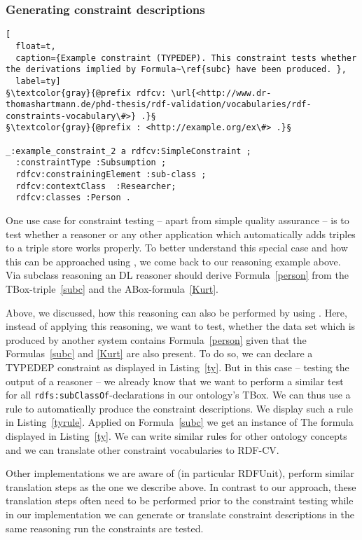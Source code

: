 \subsubsection{Generating constraint descriptions}
\begin{lstlisting}[
  float=t,
  caption={Example constraint (TYPEDEP). This constraint tests whether the derivations implied by Formula~\ref{subc} have been produced. },
  label=ty]
§\textcolor{gray}{@prefix rdfcv: \url{<http://www.dr-thomashartmann.de/phd-thesis/rdf-validation/vocabularies/rdf-constraints-vocabulary\#>} .}§
§\textcolor{gray}{@prefix : <http://example.org/ex\#> .}§

_:example_constraint_2 a rdfcv:SimpleConstraint ;
  :constraintType :Subsumption ;
  rdfcv:constrainingElement :sub-class ;
  rdfcv:contextClass  :Researcher;
  rdfcv:classes :Person .
\end{lstlisting}
One use case for constraint testing -- apart from simple quality assurance -- is to test whether a reasoner or any other application which automatically 
adds triples to a triple store works properly. 
To better understand this special case and how this can be approached using \nthree, we come back to our reasoning example above. Via subclass reasoning an 
\owl DL reasoner should derive Formula~\ref{person} from the  TBox-triple~\ref{subc} and the ABox-formula~\ref{Kurt}. %

Above, we discussed, how this reasoning can also be performed by using \nthree. Here, instead of applying this reasoning, we want to test, whether the data set 
which is produced by another system contains Formula~\ref{person} given that the Formulas~\ref{subc} and \ref{Kurt} are also present. 
To do so, we can declare a TYPEDEP constraint as displayed in Listing~\ref{ty}. But in this case -- testing the output of a reasoner -- we already know that we want to perform a similar test
for all \texttt{rdfs:subClassOf}-declarations in our ontology's TBox. 
We can thus use a rule to automatically produce the constraint descriptions. We display such a rule in Listing~\ref{tyrule}.
Applied on Formula~\ref{subc} we get an instance of The formula displayed in Listing~\ref{ty}. We can write similar rules for other ontology concepts and we can translate other constraint 
vocabularies to RDF-CV. 

Other implementations we are aware of (in particular RDFUnit), perform similar translation steps as the one we describe above. In contrast to our approach, these translation steps 
often need to be performed prior to the constraint testing while in our implementation we can generate or translate constraint descriptions in the same reasoning run the constraints are tested.

